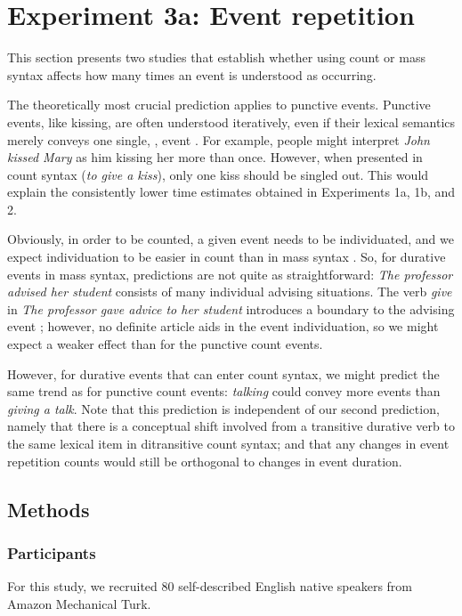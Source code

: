 \documentclass[review,12pt,authoryear]{elsarticle}
\newcommand*{\sectionformat}{\centering}
\begin{document}
\section*{\sectionformat Experiment 3a: Event repetition}\label{sec_expHowMany}

This section presents two studies that establish whether using count or mass syntax affects how many times an event is understood as occurring. 

The theoretically most crucial prediction applies to punctive events. Punctive events, like kissing, are often understood iteratively, even if their lexical semantics merely conveys one single, , event \citep{Kim2015}. For example, people might interpret \emph{John kissed Mary} as him kissing her more than once. However, when presented in count syntax (\emph{to give a kiss}), only one kiss should be singled out. This would explain the consistently lower time estimates obtained in Experiments 1a, 1b, and 2.

Obviously, in order to be counted, a given event needs to be individuated, and we expect individuation to be easier in count than in mass syntax \citep{barner2008events}. So, for durative events in mass syntax, predictions are not quite as straightforward: \emph{The professor advised her student} consists of many individual advising situations. The  verb \emph{give} in \emph{The professor gave advice to her student} introduces a boundary to the advising event \citep{Krifka1992}; however, no definite article aids in the event individuation, so we might expect a weaker effect than for the punctive count events.

However, for durative events that can enter count syntax, we might predict the same trend as for punctive count events: \emph{talking} could convey more events than \emph{giving a talk}. Note that this prediction is independent of our second prediction, namely that there is a conceptual shift involved from a transitive durative verb to the same lexical item in ditransitive count syntax; and that any changes in event repetition counts would still be orthogonal to changes in event duration.

\subsection*{\sectionformat Methods}\label{sec_methodHowMany}
\subsubsection*{Participants} \label{sec_partHowMany}
For this study, we recruited 80 self-described English native speakers from Amazon Mechanical Turk.
\end{document}
